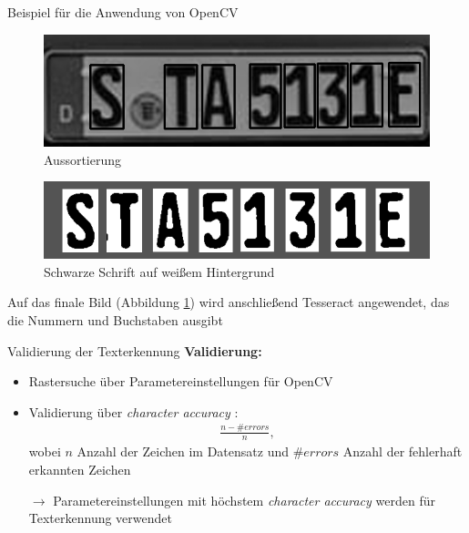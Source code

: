 \begin{frame}{Beispiel für die Anwendung von OpenCV}

\begin{figure}
\begin{center}
\includegraphics[scale=0.25]{bilder/Nummer_5_Aussortieren.png}
\caption{Aussortierung}
\label{Aussortierung}
\end{center}
\end{figure}

\begin{figure}
\begin{center}
\includegraphics[scale=0.25]{bilder/Nummer_6_SchwarzWeiss.png}
\caption{Schwarze Schrift auf weißem Hintergrund}
\label{SchwarzWeiss}
\end{center}
\end{figure}

Auf das finale Bild (Abbildung \ref{Aussortierung}) wird anschließend Tesseract angewendet, das die Nummern und Buchstaben ausgibt
\end{frame}

\begin{frame}{Validierung der Texterkennung}
    \textbf{Validierung:}
    \begin{itemize}
    \item Rastersuche über Parametereinstellungen für OpenCV
    \item Validierung über \textit{character accuracy} \cite{ocr_accuracy}:
    \begin{align*}
    \frac{n - \# \textit{errors}}{n},
    \end{align*}
    wobei $n$ Anzahl der Zeichen im Datensatz und $\# \textit{errors}$ Anzahl der fehlerhaft erkannten Zeichen 
    \item[$\rightarrow$] Parametereinstellungen mit höchstem \textit{character accuracy} werden für Texterkennung verwendet
    \end{itemize}
\end{frame}